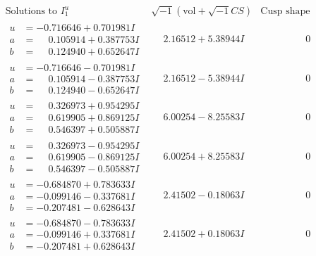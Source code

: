 \documentclass[1p]{elsarticle_modified}
\theoremstyle{definition}
\newcommand{\I}{\sqrt{-1}}
\begin{document}
$$\begin{array}{c|c|c}  
\text{Solutions to }I^u_{1}& \I (\text{vol} + \sqrt{-1}CS) & \text{Cusp shape}\\
 \hline 
\begin{aligned}
u &= -0.716646 + 0.701981 I \\
a &= \phantom{-}0.105914 + 0.387753 I \\
b &= \phantom{-}0.124940 + 0.652647 I\end{aligned}
 & \phantom{-}2.16512 + 5.38944 I & \phantom{-0.000000 } 0 \\ \hline\begin{aligned}
u &= -0.716646 - 0.701981 I \\
a &= \phantom{-}0.105914 - 0.387753 I \\
b &= \phantom{-}0.124940 - 0.652647 I\end{aligned}
 & \phantom{-}2.16512 - 5.38944 I & \phantom{-0.000000 } 0 \\ \hline\begin{aligned}
u &= \phantom{-}0.326973 + 0.954295 I \\
a &= \phantom{-}0.619905 + 0.869125 I \\
b &= \phantom{-}0.546397 + 0.505887 I\end{aligned}
 & \phantom{-}6.00254 - 8.25583 I & \phantom{-0.000000 } 0 \\ \hline\begin{aligned}
u &= \phantom{-}0.326973 - 0.954295 I \\
a &= \phantom{-}0.619905 - 0.869125 I \\
b &= \phantom{-}0.546397 - 0.505887 I\end{aligned}
 & \phantom{-}6.00254 + 8.25583 I & \phantom{-0.000000 } 0 \\ \hline\begin{aligned}
u &= -0.684870 + 0.783633 I \\
a &= -0.099146 - 0.337681 I \\
b &= -0.207481 - 0.628643 I\end{aligned}
 & \phantom{-}2.41502 - 0.18063 I & \phantom{-0.000000 } 0 \\ \hline\begin{aligned}
u &= -0.684870 - 0.783633 I \\
a &= -0.099146 + 0.337681 I \\
b &= -0.207481 + 0.628643 I\end{aligned}
 & \phantom{-}2.41502 + 0.18063 I & \phantom{-0.000000 } 0 \\ \hline\begin{aligned}

\end{aligned}
\end{array}$$
\end{document}
